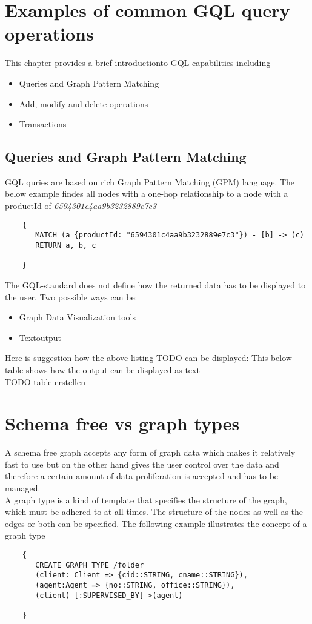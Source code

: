 \section{Examples of common GQL query operations}
This chapter provides a brief introductionto GQL capabilities including
\begin{itemize}
	\item Queries and Graph Pattern Matching
	\item Add, modify and delete operations
	\item Transactions
\end{itemize}
\subsection{Queries and Graph Pattern Matching}
GQL quries are based on rich Graph Pattern Matching (GPM) language.
The below example findes all nodes with a one-hop relationship to a node with a 
productId of \textit{6594301c4aa9b3232889e7c3}
\begin{lstlisting}
    {
       MATCH (a {productId: "6594301c4aa9b3232889e7c3"}) - [b] -> (c)
	   RETURN a, b, c

    }
\end{lstlisting}

The GQL-standard does not define how the returned data has to be displayed
to the user. Two possible ways can be:
\begin{itemize}
	\item Graph Data Visualization tools
	\item Textoutput
\end{itemize}
Here is suggestion how the above listing TODO can be displayed:
This below table shows how the output can be displayed as text \\
TODO table erstellen

\section{Schema free vs graph types}
A schema free graph accepts any form of graph data which makes it relatively fast to use 
but on the other hand gives the user control over the data 
and therefore a certain amount of data proliferation is accepted and has to be managed.\\
A graph type is a kind of template that specifies the structure of the graph, which must be adhered to at all times.
The structure of the nodes as well as the edges or both can be specified.
The following example illustrates the concept of a graph type
\begin{lstlisting}
    {
       CREATE GRAPH TYPE /folder
       (client: Client => {cid::STRING, cname::STRING}),
       (agent:Agent => {no::STRING, office::STRING}),
       (client)-[:SUPERVISED_BY]->(agent)

    }
\end{lstlisting}

